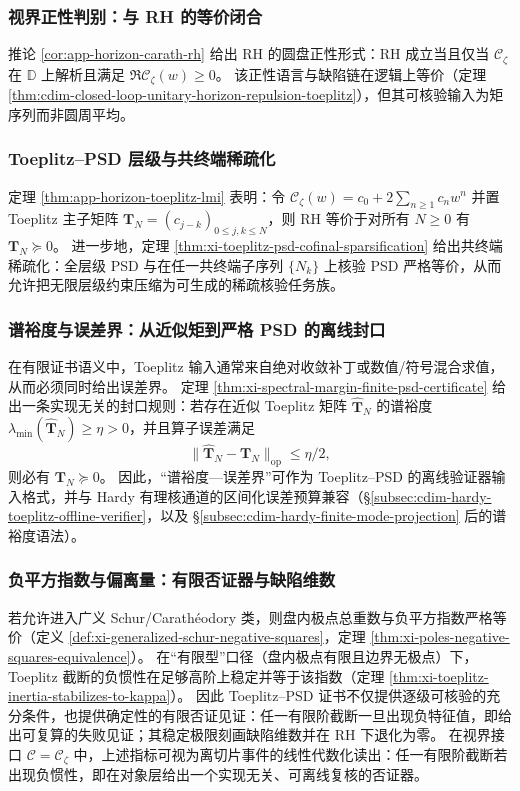 \subsubsection{视界正性判别：与 RH 的等价闭合}
推论 \ref{cor:app-horizon-carath-rh} 给出 RH 的圆盘正性形式：RH 成立当且仅当 \(\mathscr{C}_{\zeta}\) 在 \(\mathbb{D}\) 上解析且满足 \(\Re \mathscr{C}_{\zeta}(w)\ge 0\)。
该正性语言与缺陷链在逻辑上等价（定理 \ref{thm:cdim-closed-loop-unitary-horizon-repulsion-toeplitz}），但其可核验输入为矩序列而非圆周平均。

\subsubsection{Toeplitz--PSD 层级与共终端稀疏化}
定理 \ref{thm:app-horizon-toeplitz-lmi} 表明：令
\(
\mathscr{C}_{\zeta}(w)=c_0+2\sum_{n\ge 1}c_n w^n
\)
并置 Toeplitz 主子矩阵 \(\mathbf{T}_N=(c_{j-k})_{0\le j,k\le N}\)，则 RH 等价于对所有 \(N\ge 0\) 有 \(\mathbf{T}_N\succeq 0\)。
进一步地，定理 \ref{thm:xi-toeplitz-psd-cofinal-sparsification} 给出共终端稀疏化：全层级 PSD 与在任一共终端子序列 \(\{N_k\}\) 上核验 PSD 严格等价，从而允许把无限层级约束压缩为可生成的稀疏核验任务族。

\subsubsection{谱裕度与误差界：从近似矩到严格 PSD 的离线封口}
在有限证书语义中，Toeplitz 输入通常来自绝对收敛补丁或数值/符号混合求值，从而必须同时给出误差界。
定理 \ref{thm:xi-spectral-margin-finite-psd-certificate} 给出一条实现无关的封口规则：若存在近似 Toeplitz 矩阵 \(\widehat{\mathbf{T}}_N\) 的谱裕度 \(\lambda_{\min}(\widehat{\mathbf{T}}_N)\ge \eta>0\)，并且算子误差满足
\[
\bigl\|\widehat{\mathbf{T}}_N-\mathbf{T}_N\bigr\|_{\mathrm{op}}\le \eta/2,
\]
则必有 \(\mathbf{T}_N\succeq 0\)。
因此，“谱裕度—误差界”可作为 Toeplitz--PSD 的离线验证器输入格式，并与 Hardy 有理核通道的区间化误差预算兼容（\S\ref{subsec:cdim-hardy-toeplitz-offline-verifier}，以及 \S\ref{subsec:cdim-hardy-finite-mode-projection} 后的谱裕度语法）。

\subsubsection{负平方指数与偏离量：有限否证器与缺陷维数}
若允许进入广义 Schur/Carath\'eodory 类，则盘内极点总重数与负平方指数严格等价（定义 \ref{def:xi-generalized-schur-negative-squares}，定理 \ref{thm:xi-poles-negative-squares-equivalence}）。
在“有限型”口径（盘内极点有限且边界无极点）下，Toeplitz 截断的负惯性在足够高阶上稳定并等于该指数（定理 \ref{thm:xi-toeplitz-inertia-stabilizes-to-kappa}）。
因此 Toeplitz--PSD 证书不仅提供逐级可核验的充分条件，也提供确定性的有限否证见证：任一有限阶截断一旦出现负特征值，即给出可复算的失败见证；其稳定极限刻画缺陷维数并在 RH 下退化为零。
在视界接口 \(\mathscr{C}=\mathscr{C}_{\zeta}\) 中，上述指标可视为离切片事件的线性代数化读出：任一有限阶截断若出现负惯性，即在对象层给出一个实现无关、可离线复核的否证器。


